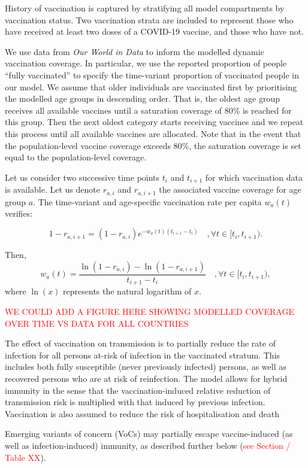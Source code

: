 
History of vaccination is captured by stratifying all model compartments by vaccination status.
Two vaccination strata are included to represent those who have received at least two doses of a COVID-19 vaccine,
and those who have not.

We use data from \textit{Our World in Data} to inform the modelled dynamic vaccination coverage. In particular, we use the reported proportion of 
people ``fully vaccinated'' to specify the time-variant proportion of vaccinated people in our model. We assume that older individuals are vaccinated 
first by prioritising the modelled age groups in descending order. That is, the oldest age group receives all available vaccines until a 
saturation coverage of 80\% is reached for this group. Then the next oldest category starts receiving vaccines and we repeat this process until all available vaccines
are allocated. Note that in the event that the population-level vaccine coverage exceeds 80\%, the saturation coverage is set equal to the population-level coverage. 

Let us consider two successive time points $t_i$ and $t_{i+1}$ for which vaccination data is available. Let us denote $r_{a, i}$ and $r_{a, i+1}$ the associated vaccine 
coverage for age group $a$. The time-variant and age-specific vaccination rate per capita $w_a(t)$ verifies:

\begin{equation}
    1 - r_{a, i+1} = (1 - r_{a, i})e^{-w_a(t)(t_{i+1} - t_i)} \quad, \forall t \in [t_i, t_{i+1}) .
\end{equation}

Then, 
\begin{equation}
    \label{eq:vacc}
    w_a(t) = \frac{\ln(1 - r_{a, i}) - \ln(1 - r_{a, i+1})}{t_{i+1} - t_i} \quad, \forall t \in [t_i, t_{i+1}) ,
\end{equation}
where $\ln(x)$ represents the natural logarithm of $x$.

\textcolor{red}{WE COULD ADD A FIGURE HERE SHOWING MODELLED COVERAGE OVER TIME VS DATA FOR ALL COUNTRIES}

The effect of vaccination on transmission is to partially reduce the rate of infection for all persons at-risk of infection in the vaccinated stratum.
This includes both fully susceptible (never previously infected) persons,
as well as recovered persons who are at risk of reinfection. The model allows for hybrid immunity
in the sense that the vaccination-induced relative reduction of transmission risk is multiplied with that induced by previous infection. Vaccination is also assumed to reduce the risk of hospitalisation and death 

Emerging variants of concern (VoCs) may partially escape vaccine-induced (as well as infection-induced) immunity, as described further below (\textcolor{red}{see Section / Table XX}).

